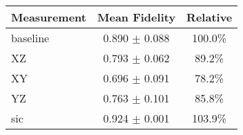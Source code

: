 \begin{tabular}{lcc}
\toprule
Measurement & Mean Fidelity & Relative \\
\midrule
baseline & 0.890 $\pm$ 0.088 & 100.0\% \\
XZ & 0.793 $\pm$ 0.062 & 89.2\% \\
XY & 0.696 $\pm$ 0.091 & 78.2\% \\
YZ & 0.763 $\pm$ 0.101 & 85.8\% \\
sic & 0.924 $\pm$ 0.001 & 103.9\% \\
\bottomrule
\end{tabular}
